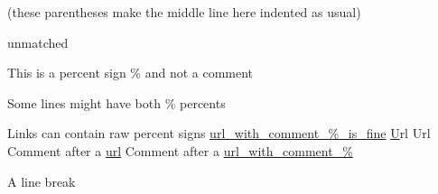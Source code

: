 \documentclass{article}
\begin{document}
(these parentheses
make the middle line here
indented as usual)


unmatched %

This is a percent sign \% and not a comment

Some lines might have both \% percents %

Links can contain raw percent signs
\url{url_with_comment_%_is_fine}
\href{url_with_comment_%_is_fine}
Url %
Url %
Comment after a \url{url} %
Comment after a \url{url_with_comment_%} %

A line break \\%
\end{document}
